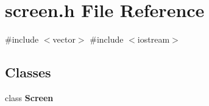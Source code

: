 \section{screen.\+h File Reference}
\label{screen_8h}
{\ttfamily \#include $<$vector$>$}\newline
{\ttfamily \#include $<$iostream$>$}\newline
\subsection*{Classes}
\begin{DoxyCompactItemize}
\item 
class \textbf{ Screen}
\end{DoxyCompactItemize}
